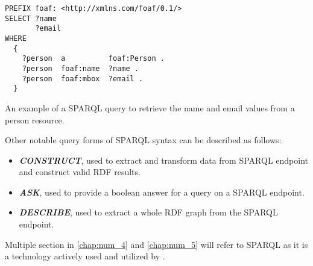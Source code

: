 \begin{listing}[H]    
\begin{verbatim}
PREFIX foaf: <http://xmlns.com/foaf/0.1/>
SELECT ?name 
       ?email
WHERE
  {
    ?person  a          foaf:Person .
    ?person  foaf:name  ?name .
    ?person  foaf:mbox  ?email .
  }
\end{verbatim}
\caption{An example of a SPARQL query to retrieve the name and email values from a person resource.} 
\label{lst:intro_sparql_triple_example}
\end{listing}

Other notable query forms of SPARQL syntax can be described as follows:
\begin{itemize}
    \item \textit{\textbf{CONSTRUCT}}, used to extract and transform data from SPARQL endpoint and construct valid RDF results.
    \item \textit{\textbf{ASK}}, used to provide a boolean answer for a query on a SPARQL endpoint.
    \item \textit{\textbf{DESCRIBE}}, used to extract a whole RDF graph from the SPARQL endpoint.
\end{itemize}

Multiple section in \autoref{chap:num_4} and \autoref{chap:num_5} will refer to SPARQL as it is a technology actively used and utilized by \solid{}.
 
\section{\solid{}}

